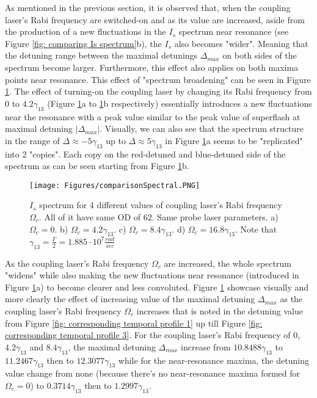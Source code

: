 As mentioned in the previous section, it is observed that, when the coupling laser's Rabi frequency are switched-on and as its value are increased, aside from the production of a new fluctuations in the $I_{s}$ spectrum near resonance (see Figure \ref{fig: comparing Is spectrum}b), the $I_{s}$ also becomes "wider". Meaning  that the detuning range between the maximal detunings $\Delta_{max}$ on both sides of the spectrum become larger. Furthermore, this effect also applies on both maxima points near resonance. This effect of "spectrum broadening" can be seen in Figure \ref{fig: compare Is spectrums}. The effect of turning-on the coupling laser by changing its Rabi frequency from $0$ to $4.2\gamma_{13}$ (Figure \ref{fig: compare Is spectrums}a to \ref{fig: compare Is spectrums}b respectively) essentially introduces a new fluctuations near the resonance with a peak value similar to the peak value of superflash at maximal detuning $|\Delta_{max}|$. Visually, we can also see that the spectrum structure in the range of  $\Delta \approx -5\gamma_{13}$ up to $\Delta \approx 5\gamma_{13}$ in Figure \ref{fig: compare Is spectrums}a seems to be "replicated" into 2 "copies". Each copy on the red-detuned and blue-detuned side of the spectrum as can be seen starting from Figure \ref{fig: compare Is spectrums}b.

\begin{figure}[h!]
    \centering
    \texttt{[image: Figures/comparisonSpectral.PNG]}
    \caption{$I_{s}$ spectrum for 4 different values of coupling laser's Rabi frequency $\Omega_{c}$. All of it have same OD of 62. Same probe laser parameters. a) $\Omega_{c} = 0$. b) $\Omega_{c} = 4.2\gamma_{13}$. c) $\Omega_{c} = 8.4\gamma_{13}$. d) $\Omega_{c} = 16.8\gamma_{13}$. Note that $\gamma_{13} = \frac{\Gamma}{2} = 1.885 \cdot 10^{7} \frac{rad}{sec}$}
    \label{fig: compare Is spectrums}
\end{figure}

As the coupling laser's Rabi frequency $\Omega_{c}$ are increased, the whole spectrum "widens" while also making the new fluctuations near resonance (introduced in Figure \ref{fig: compare Is spectrums}a) to become clearer and less convoluted. Figure \ref{fig: compare Is spectrums} showcase visually and more clearly the effect of increasing value of the maximal detuning $\Delta_{max}$ as the coupling laser's Rabi frequency $\Omega_{c}$ increases that is noted in the detuning value from Figure \ref{fig: corresponding temporal profile 1} up till Figure \ref{fig: corresponding temporal profile 3}. For the coupling laser's Rabi frequency of $0$, $4.2\gamma_{13}$ and $8.4\gamma_{13}$, the maximal detuning $\Delta_{max}$ increase from $10.8488\gamma_{13}$ to $11.2467\gamma_{13}$ then to $12.3077\gamma_{13}$ while for the near-resonance maxima, the detuning value change from none (because there's no near-resonance maxima formed for $\Omega_{c} = 0$) to $0.3714\gamma_{13}$ then to $1.2997\gamma_{13}$.

